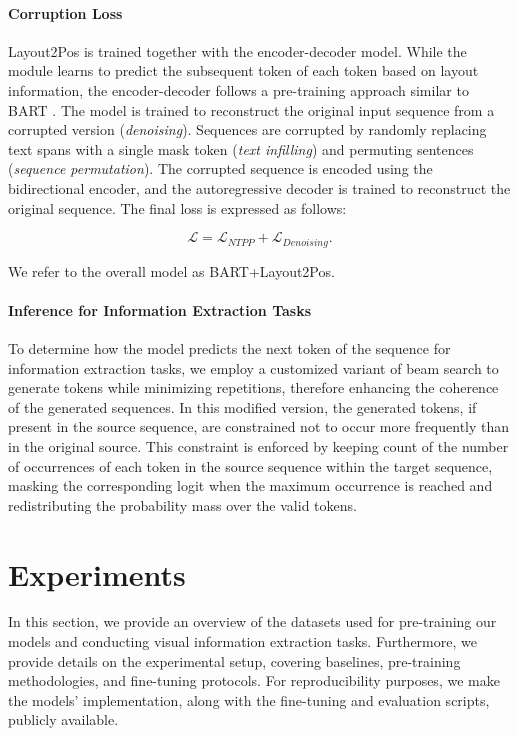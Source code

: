 \paragraph{Corruption Loss} Layout2Pos is trained together with the encoder-decoder model. While the module learns to predict the subsequent token of each token based on layout information, the encoder-decoder follows a pre-training approach similar to \ac{BART} \citep{lewis2019bart}. The model is trained to reconstruct the original input sequence from a corrupted version (\textit{denoising}). Sequences are corrupted by randomly replacing text spans with a single mask token (\textit{text infilling}) and permuting sentences (\textit{sequence permutation}). The corrupted sequence is encoded using the bidirectional encoder, and the autoregressive decoder is trained to reconstruct the original sequence. The final loss is expressed as follows:

\begin{equation}
  \mathcal{L} = \mathcal{L}_{NTPP} + \mathcal{L}_{Denoising}.
\end{equation}

\noindent We refer to the overall model as BART+Layout2Pos. 


\paragraph{Inference for Information Extraction Tasks} To determine how the model predicts the next token of the sequence for information extraction tasks, we employ a customized variant of beam search to generate tokens while minimizing repetitions, therefore enhancing the coherence of the generated sequences. In this modified version, the generated tokens, if present in the source sequence, are constrained not to occur more frequently than in the original source. This constraint is enforced by keeping count of the number of occurrences of each token in the source sequence within the target sequence, masking the corresponding logit when the maximum occurrence is reached and redistributing the probability mass over the valid tokens. 


\section{Experiments}

In this section, we provide an overview of the datasets used for pre-training our models and conducting visual information extraction tasks. Furthermore, we provide details on the experimental setup, covering baselines, pre-training methodologies, and fine-tuning protocols. For reproducibility purposes, we make the models' implementation, along with the fine-tuning and evaluation scripts, publicly available. 


